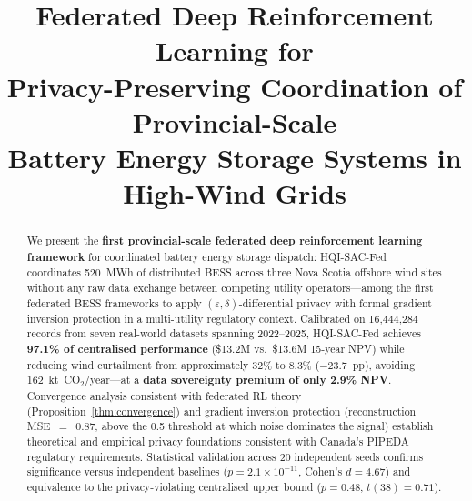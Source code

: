 \documentclass[journal]{IEEEtran}
\begin{document}
\title{Federated Deep Reinforcement Learning for\\
Privacy-Preserving Coordination of Provincial-Scale\\
Battery Energy Storage Systems in High-Wind Grids}

\author{%
}

\maketitle

\begin{abstract}
We present the \textbf{first provincial-scale federated deep reinforcement
learning framework} for coordinated battery energy storage dispatch:
HQI-SAC-Fed coordinates 520~MWh of distributed BESS across three Nova
Scotia offshore wind sites without any raw data exchange between competing
utility operators---among the first federated BESS frameworks to apply
$(\varepsilon,\delta)$-differential privacy with formal gradient inversion
protection in a multi-utility regulatory context.
Calibrated on 16,444,284 records from seven real-world datasets spanning
2022--2025, HQI-SAC-Fed achieves \textbf{97.1\% of centralised
performance} (\$13.2M vs.\ \$13.6M 15-year NPV) while reducing wind
curtailment from approximately 32\% to 8.3\% ($-$23.7~pp), avoiding
162~kt~CO$_2$/year---at a \textbf{data sovereignty premium of only 2.9\%
NPV}. Convergence analysis consistent with federated RL theory
(Proposition~\ref{thm:convergence}) and gradient inversion protection
(reconstruction MSE~$=$~0.87, above the 0.5 threshold at which noise
dominates the signal) establish theoretical and empirical privacy
foundations consistent with Canada's PIPEDA regulatory requirements.
Statistical validation across 20 independent seeds confirms significance
versus independent baselines ($p = 2.1 \times 10^{-11}$, Cohen's
$d = 4.67$) and equivalence to the privacy-violating centralised upper
bound ($p = 0.48$, $t(38)=0.71$).
\end{abstract}
\end{document}
